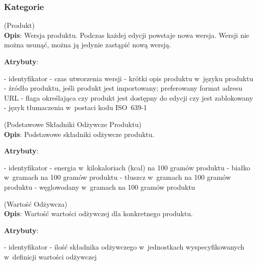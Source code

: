 \subsubsection{Kategorie}\label{subsubsec:database:products:categories}
\begin{enumerate}[label={\textbf{KAT/2/\protect\twodigits{\theenumi}}}, wide, labelwidth=!, labelindent=0pt, labelsep=0pt, series=reqs]
    \setlength\itemsep{1.75em}
    \label{kat:Product} (Produkt)\\
    \indent\textbf{Opis}: Wersja produktu. Podczas każdej edycji powstaje nowa wersja. Wersji nie można usunąć, można ją jedynie zastąpić nową wersją.
    \par
    \textbf{Atrybuty}:
    \begin{itemize}[series=atr, wide, align=left, leftmargin=190pt]
        \label{kat:Product:id}- identyfikator
        \label{kat:Product:createdDate}- czas utworzenia wersji
        \label{kat:Product:description}- krótki opis produktu w~języku produktu
        \label{kat:Product:source}- źródło produktu, jeśli produkt jest importowany; preferowany format adresu URL
        \label{kat:Product:isFinal}- flaga określająca czy produkt jest dostępny do edycji czy jest zablokowany
        \label{kat:Product:language}- język tłumaczenia w~postaci kodu ISO~639-1
    \end{itemize}

    \label{kat:ProductBasicNutritionData} (Podstawowe Składniki Odżywcze Produktu)\\
    \indent\textbf{Opis}: Podstawowe składniki odżywcze produktu.
    \par
    \textbf{Atrybuty}:
    \begin{itemize}[series=atr, wide, align=left, leftmargin=190pt]
        \label{kat:ProductBasicNutritionData:id}- identyfikator
        \label{kat:ProductBasicNutritionData:energy}- energia w~kilokaloriach (kcal) na 100 gramów produktu
        \label{kat:ProductBasicNutritionData:protein}- białko w~gramach na 100 gramów produktu
        \label{kat:ProductBasicNutritionData:fat}- tłuszcz w~gramach na 100 gramów produktu
        \label{kat:ProductBasicNutritionData:carbohydrates}- węglowodany w~gramach na 100 gramów produktu
    \end{itemize}

    \label{kat:NutritionData} (Wartość Odżywcza)\\
    \indent\textbf{Opis}: Wartość wartości odżywczej dla konkretnego produktu.
    \par
    \textbf{Atrybuty}:
    \begin{itemize}[series=atr, wide, align=left, leftmargin=190pt]
        \label{kat:NutritionData:id}- identyfikator
        \label{kat:NutritionData:nutritionValue}- ilość składnika odżywczego w~jednostkach wyspecyfikowanych w~definicji wartości odżywczej
    \end{itemize}


\end{enumerate}
